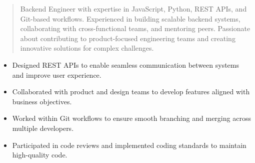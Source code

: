



\makecvheader

\begin{quote}
  \noindent
  Backend Engineer with expertise in JavaScript, Python, REST APIs, and Git-based workflows. Experienced in building scalable backend systems, collaborating with cross-functional teams, and mentoring peers. Passionate about contributing to product-focused engineering teams and creating innovative solutions for complex challenges.
\end{quote}

\par\smallskip
\noindent
\begin{minipage}{20cm}
  \begin{minipage}{9.75cm}
    \begin{itemize}
      \item Designed REST APIs to enable seamless communication between systems and improve user experience.
      \item Collaborated with product and design teams to develop features aligned with business objectives.
    \end{itemize}
  \end{minipage}
  \hfill
  \begin{minipage}{9.75cm}
    \begin{itemize}
      \item Worked within Git workflows to ensure smooth branching and merging across multiple developers.
      \item Participated in code reviews and implemented coding standards to maintain high-quality code.
    \end{itemize}
  \end{minipage}
\end{minipage}
\par\smallskip
\divider

